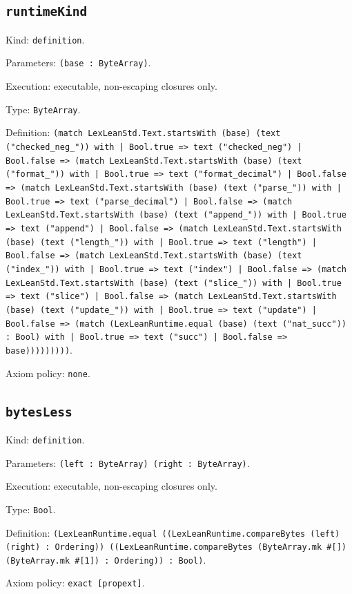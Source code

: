 \documentclass[11pt]{article}
\begin{document}
\subsection*{\texttt{runtimeKind}}
\noindent Kind: \texttt{definition}.\par
\noindent Parameters: \texttt{(base : ByteArray)}.\par
\noindent Execution: executable, non-escaping closures only.\par
\noindent Type: \texttt{ByteArray}.\par
\noindent Definition: \texttt{(match LexLeanStd.Text.startsWith (base) (text ("checked\_neg\_")) with | Bool.true => text ("checked\_neg") | Bool.false => (match LexLeanStd.Text.startsWith (base) (text ("format\_")) with | Bool.true => text ("format\_decimal") | Bool.false => (match LexLeanStd.Text.startsWith (base) (text ("parse\_")) with | Bool.true => text ("parse\_decimal") | Bool.false => (match LexLeanStd.Text.startsWith (base) (text ("append\_")) with | Bool.true => text ("append") | Bool.false => (match LexLeanStd.Text.startsWith (base) (text ("length\_")) with | Bool.true => text ("length") | Bool.false => (match LexLeanStd.Text.startsWith (base) (text ("index\_")) with | Bool.true => text ("index") | Bool.false => (match LexLeanStd.Text.startsWith (base) (text ("slice\_")) with | Bool.true => text ("slice") | Bool.false => (match LexLeanStd.Text.startsWith (base) (text ("update\_")) with | Bool.true => text ("update") | Bool.false => (match (LexLeanRuntime.equal (base) (text ("nat\_succ")) : Bool) with | Bool.true => text ("succ") | Bool.false => base)))))))))}.\par
\noindent Axiom policy: \texttt{none}.\par
\subsection*{\texttt{bytesLess}}
\noindent Kind: \texttt{definition}.\par
\noindent Parameters: \texttt{(left : ByteArray) (right : ByteArray)}.\par
\noindent Execution: executable, non-escaping closures only.\par
\noindent Type: \texttt{Bool}.\par
\noindent Definition: \texttt{(LexLeanRuntime.equal ((LexLeanRuntime.compareBytes (left) (right) : Ordering)) ((LexLeanRuntime.compareBytes (ByteArray.mk \#[]) (ByteArray.mk \#[1]) : Ordering)) : Bool)}.\par
\noindent Axiom policy: \texttt{exact [propext]}.\par
\end{document}
